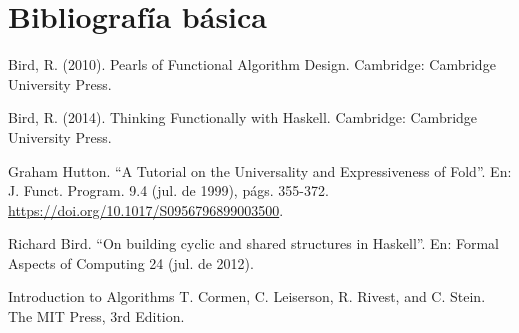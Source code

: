 \documentclass[letterpaper,10pt]{article}
\begin{document}
\section{Bibliografía básica}

\begin{enumerate}[label={[\arabic*]}]
\item Bird, R. (2010). Pearls of Functional Algorithm Design.
Cambridge: Cambridge University Press.
\item Bird, R. (2014). Thinking Functionally with Haskell. Cambridge: Cambridge University Press.
\item Graham Hutton. ``A Tutorial on the Universality and Expressiveness of Fold''.
En: J. Funct. Program. 9.4 (jul. de 1999), págs. 355-372.
\url{https://doi.org/10.1017/S0956796899003500}.
\item Richard Bird. ``On building cyclic and shared structures in Haskell''. En: Formal Aspects of
Computing 24 (jul. de 2012).
\item Introduction to Algorithms T. Cormen, C. Leiserson, R. Rivest, and C. Stein. The MIT Press,
3rd Edition.
\end{enumerate}
\end{document}
